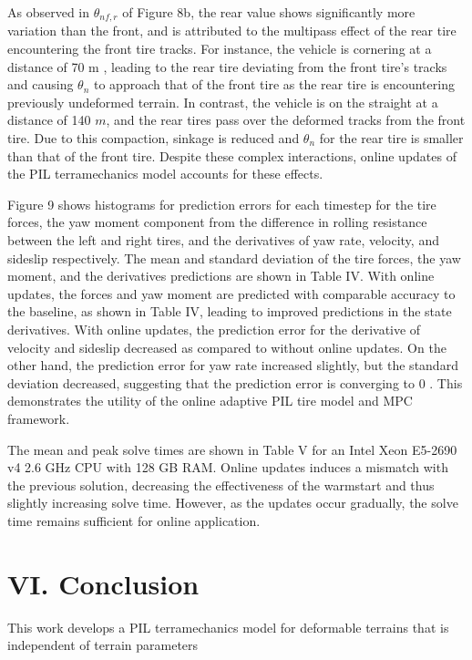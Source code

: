 \documentclass[10pt]{article}
\begin{document}
As observed in $\theta_{n f, r}$ of Figure 8b, the rear value shows significantly more variation than the front, and is attributed to the multipass effect of the rear tire encountering the front tire tracks. For instance, the vehicle is cornering at a distance of 70 m , leading to the rear tire deviating from the front tire's tracks and causing $\theta_{n}$ to approach that of the front tire as the rear tire is encountering previously undeformed terrain. In contrast, the vehicle is on the straight at a distance of 140 $m$, and the rear tires pass over the deformed tracks from the front tire. Due to this compaction, sinkage is reduced and $\theta_{n}$ for the rear tire is smaller than that of the front tire. Despite these complex interactions, online updates of the PIL terramechanics model accounts for these effects.

Figure 9 shows histograms for prediction errors for each timestep for the tire forces, the yaw moment component from the difference in rolling resistance between the left and right tires, and the derivatives of yaw rate, velocity, and sideslip respectively. The mean and standard deviation of the tire forces, the yaw moment, and the derivatives predictions are shown in Table IV. With online updates, the forces and yaw moment are predicted with comparable accuracy to the baseline, as shown in Table IV, leading to improved predictions in the state derivatives. With online updates, the prediction error for the derivative of velocity and sideslip decreased as compared to without online updates. On the other hand, the prediction error for yaw rate increased slightly, but the standard deviation decreased, suggesting that the prediction error is converging to 0 . This demonstrates the utility of the online adaptive PIL tire model and MPC framework.

The mean and peak solve times are shown in Table V for an Intel Xeon E5-2690 v4 2.6 GHz CPU with 128 GB RAM. Online updates induces a mismatch with the previous solution, decreasing the effectiveness of the warmstart and thus slightly increasing solve time. However, as the updates occur gradually, the solve time remains sufficient for online application.

\section*{VI. Conclusion}
This work develops a PIL terramechanics model for deformable terrains that is independent of terrain parameters
\end{document}
